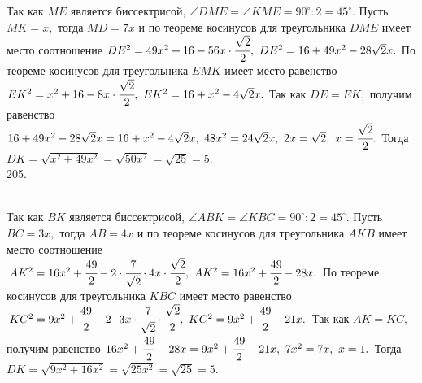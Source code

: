 \documentclass[12pt]{article}
\begin{document}
Так как $ME$ является биссектрисой, $\angle DME=\angle KME=90^\circ:2=45^\circ.$ Пусть $MK=x,$ тогда $MD=7x$ и по теореме косинусов для треугольника $DME$ имеет место соотношение $DE^2=49x^2+16-56x\cdot \cfrac{\sqrt{2}}{2},\ DE^2=16+49x^2-28\sqrt{2}x.$ По теореме косинусов для треугольника $EMK$ имеет место равенство $EK^2=x^2+16-8x\cdot \cfrac{\sqrt{2}}{2},\ EK^2=16+x^2-4\sqrt{2}x.$ Так как $DE=EK,$ получим равенство $16+49x^2-28\sqrt{2}x=16+x^2-4\sqrt{2}x,\ 48x^2=24\sqrt{2}x,\ 2x=\sqrt{2},\ x=\cfrac{\sqrt{2}}{2}.$ Тогда $DK=\sqrt{x^2+49x^2}=\sqrt{50x^2}=\sqrt{25}=5.$\\
205. \begin{figure}[ht!]
\end{figure}\\
Так как $BK$ является биссектрисой, $\angle ABK=\angle KBC=90^\circ:2=45^\circ.$ Пусть $BC=3x,$ тогда $AB=4x$ и по теореме косинусов для треугольника $AKB$ имеет место соотношение $AK^2=16x^2+\cfrac{49}{2}-2\cdot\cfrac{7}{\sqrt{2}}\cdot 4x\cdot \cfrac{\sqrt{2}}{2},\ AK^2=16x^2+\cfrac{49}{2}-28x.$ По теореме косинусов для треугольника $KBC$ имеет место равенство $KC^2=9x^2+\cfrac{49}{2}-2\cdot 3x\cdot\cfrac{7}{\sqrt{2}}\cdot \cfrac{\sqrt{2}}{2},\ KC^2=9x^2+\cfrac{49}{2}-21x.$ Так как $AK=KC,$ получим равенство $16x^2+\cfrac{49}{2}-28x=9x^2+\cfrac{49}{2}-21x,\ 7x^2=7x,\ x=1.$ Тогда $DK=\sqrt{9x^2+16x^2}=\sqrt{25x^2}=\sqrt{25}=5.$\\
\end{document}
